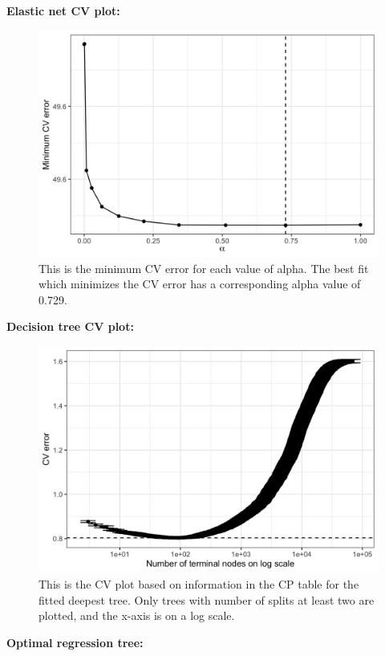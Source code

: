 \documentclass[
]{article}
\begin{document}
\textbf{Elastic net CV plot:}

\begin{figure}[H]

{\centering \includegraphics[width=0.8\linewidth]{../results/elnet-cv-error-alpha-plot} 

}

\caption{This is the minimum CV error for each value of alpha. The best fit which minimizes the CV error has a corresponding alpha value of 0.729.}\label{fig:elnet-cv-error-alpha-plot}
\end{figure}

\textbf{Decision tree CV plot:}

\begin{figure}[H]

{\centering \includegraphics[width=0.7\linewidth]{../results/cp-table-cv-plot} 

}

\caption{This is the CV plot based on information in the CP table for the fitted deepest tree. Only trees with number of splits at least two are plotted, and the x-axis is on a log scale.}\label{fig:deepest-tree-cv-plot}
\end{figure}

\textbf{Optimal regression tree:}
\end{document}
